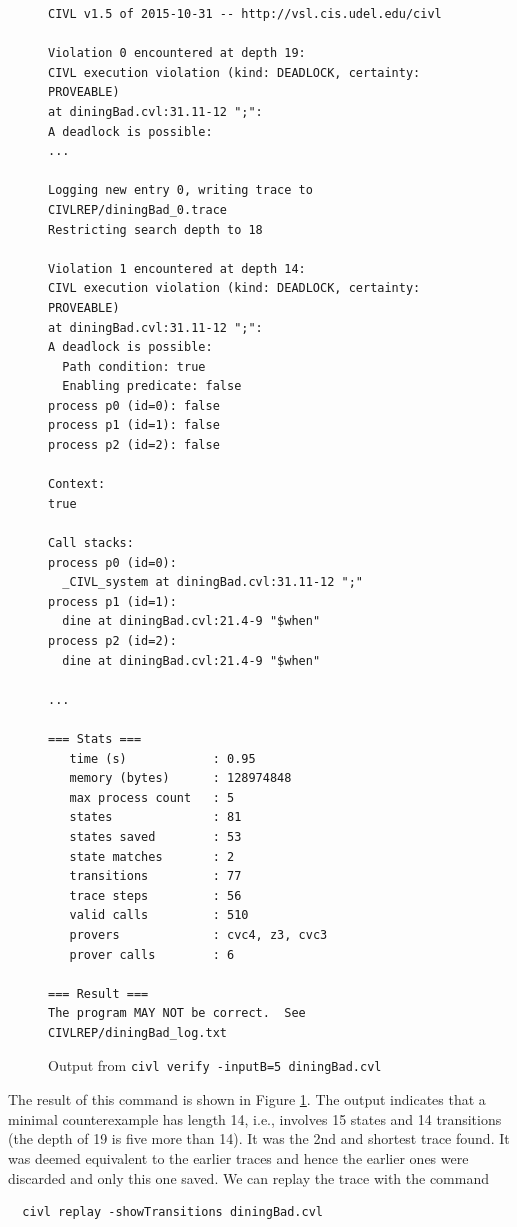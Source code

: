 \begin{figure}[t]
  \begin{small}
\begin{verbatim}
CIVL v1.5 of 2015-10-31 -- http://vsl.cis.udel.edu/civl

Violation 0 encountered at depth 19:
CIVL execution violation (kind: DEADLOCK, certainty: PROVEABLE)
at diningBad.cvl:31.11-12 ";":
A deadlock is possible:
...

Logging new entry 0, writing trace to CIVLREP/diningBad_0.trace
Restricting search depth to 18

Violation 1 encountered at depth 14:
CIVL execution violation (kind: DEADLOCK, certainty: PROVEABLE)
at diningBad.cvl:31.11-12 ";":
A deadlock is possible:
  Path condition: true
  Enabling predicate: false
process p0 (id=0): false
process p1 (id=1): false
process p2 (id=2): false

Context:
true

Call stacks:
process p0 (id=0):
  _CIVL_system at diningBad.cvl:31.11-12 ";"
process p1 (id=1):
  dine at diningBad.cvl:21.4-9 "$when"
process p2 (id=2):
  dine at diningBad.cvl:21.4-9 "$when"

...

=== Stats ===
   time (s)            : 0.95
   memory (bytes)      : 128974848
   max process count   : 5
   states              : 81
   states saved        : 53
   state matches       : 2
   transitions         : 77
   trace steps         : 56
   valid calls         : 510
   provers             : cvc4, z3, cvc3
   prover calls        : 6

=== Result ===
The program MAY NOT be correct.  See CIVLREP/diningBad_log.txt
\end{verbatim}
  \end{small}
  \caption{Output from \texttt{civl verify -inputB=5 diningBad.cvl}}
  \label{fig:diningOut}
\end{figure}

The result of this command is shown in Figure \ref{fig:diningOut}. The
output indicates that a minimal counterexample has length 14, i.e.,
involves 15 states and 14 transitions (the depth of 19 is five more
than 14).    It was the 2nd and shortest trace found.  It was deemed
equivalent to the earlier traces and hence the earlier ones were
discarded and only this one saved.  We can replay the trace with the command
\begin{verbatim}
  civl replay -showTransitions diningBad.cvl
\end{verbatim}

